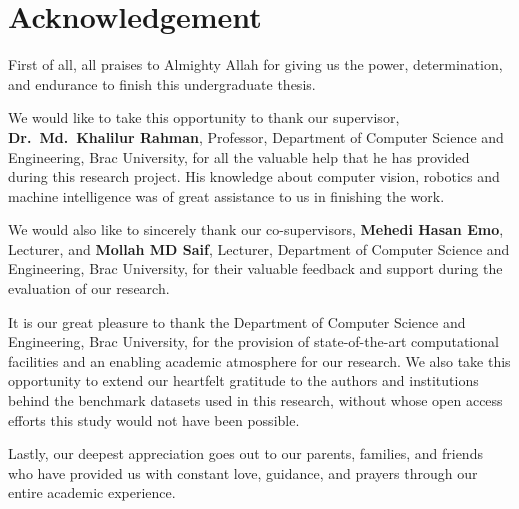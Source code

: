 \section*{Acknowledgement}

First of all, all praises to Almighty Allah for giving us the power, determination, and endurance to finish this undergraduate thesis.

We would like to take this opportunity to thank our supervisor, \textbf{Dr.~Md.~Khalilur Rahman}, Professor, Department of Computer Science and Engineering, Brac University, for all the valuable help that he has provided during this research project. His knowledge about computer vision, robotics and machine intelligence was of great assistance to us in finishing the work.

We would also like to sincerely thank our co-supervisors, \textbf{Mehedi Hasan Emo}, Lecturer, and \textbf{Mollah MD Saif}, Lecturer, Department of Computer Science and Engineering, Brac University, for their valuable feedback and support during the evaluation of our research.

It is our great pleasure to thank the Department of Computer Science and Engineering, Brac University, for the provision of state-of-the-art computational facilities and an enabling academic atmosphere for our research. We also take this opportunity to extend our heartfelt gratitude to the authors and institutions behind the benchmark datasets used in this research, without whose open access efforts this study would not have been possible.

Lastly, our deepest appreciation goes out to our parents, families, and friends who have provided us with constant love, guidance, and prayers through our entire academic experience.

\clearpage

